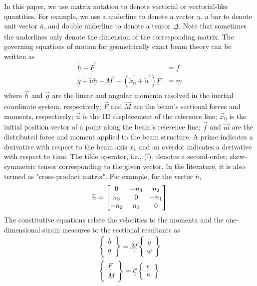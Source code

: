 In this paper, we use matrix notation to denote vectorial or vectorial-like
quantities. For example, we use a underline to denote a vector
$\underline{u}$, a bar to denote unit vector $\bar{n}$, and double underline
to denote a tensor $\underline{\underline{\Delta}}$. Note that sometimes the
underlines only denote the dimension of the corresponding matrix. The
governing equations of motion for geometrically exact beam theory can be written
as\cite{Bauchau:2010}
\begin{align}
	\label{GovernGEBT-1}
	\dot{\underline{h}} - \underline{F}^\prime &= \underline{f} \\
	\label{GovernGEBT-2}
	\dot{\underline{g}} + \dot{\tilde{u}} \underline{h} - \underline{M}^\prime - (\tilde{x}_0^\prime + \tilde{u}^\prime) \underline{F} &= \underline{m}
\end{align}
where $\vec{h}$ and $\vec{g}$ are the linear and angular momenta resolved in
the inertial coordinate system, respectively; $\vec{F}$ and $\vec{M}$ are
the beam's sectional forces and moments, respectively; $\vec{u}$ is the 1D
displacement of the reference line; $\vec{x}_0$ is the initial position vector of a
point along the beam's reference line; $\vec{f}$ and $\vec{m}$ are the
distributed force and moment applied to the beam structure.  
A prime 
indicates a derivative with respect to the beam axis
$x_1$ and an overdot indicates a derivative with respect to time. The
tilde operator,  i.e., $(\widetilde{\cdot})$, denotes a second-order, skew-symmetric
tensor corresponding to the given vector. In the literature, it is also
termed as "cross-product matrix". For example, for the vector
$\overline{n}$,
\[
	\widetilde{n} = 
	     		\begin{bmatrix}
			0 & -n_3 & n_2 \\
			n_3 & 0 & -n_1 \\
			-n_2 & n_1 & 0\\
			\end{bmatrix}	
\]
The constitutive equations relate the velocities to the momenta and the one-dimensional strain measures to the sectional resultants as
\begin{align}
	\label{ConstitutiveMass}
	\begin{Bmatrix}
	\underline{h} \\
	\underline{g}
	\end{Bmatrix}
	= \underline{\underline{\mathcal{M}}} \begin{Bmatrix}
	\dot{\underline{u}} \\
	\underline{\omega}
	\end{Bmatrix} \\
	\label{ConstitutiveStiff}
	\begin{Bmatrix}
	\underline{F} \\
	\underline{M}
	\end{Bmatrix}
	= \underline{\underline{\mathcal{C}}} \begin{Bmatrix}
	\underline{\epsilon} \\
	\underline{\kappa}
	\end{Bmatrix}
\end{align}
